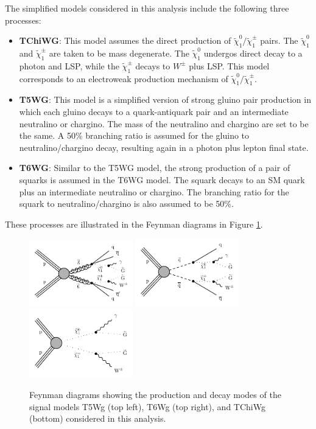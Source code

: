 \documentclass[thesis.tex]{subfiles}
\begin{document}
The simplified models considered in this analysis include the following three processes: 
	\begin{itemize}
		\item \textbf{TChiWG}: This model assumes the direct production of $\tilde{\chi}_1^0/\tilde{\chi}_1^\pm$ pairs. The $\tilde{\chi}_1^0$ and $\tilde{\chi}_1^\pm$ are taken to be mass degenerate. The $\tilde{\chi}_1^0$ undergos direct decay to a photon and LSP, while the $\tilde{\chi}_1^\pm$ decays to $W^\pm$ plus LSP. This model corresponds to an electroweak production mechanism of $\tilde{\chi}_1^0/\tilde{\chi}_1^\pm$.  
		\item  \textbf{T5WG}: This model is a simplified version of strong gluino pair production in which each gluino decays to a quark-antiquark pair and an intermediate neutralino or chargino. The mass of the neutralino and chargino are set to be the same. A 50\% branching ratio is assumed for the gluino to neutralino/chargino decay, resulting again in a photon plus lepton final state. 
		\item \textbf{T6WG}: Similar to the T5WG model, the strong production of a pair of squarks is assumed in the T6WG model. The squark decays to an SM quark plus an intermediate neutralino or chargino. The branching ratio for the squark to neutralino/chargino is also assumed to be 50\%. 
	\end{itemize}
These processes are illustrated in the Feynman diagrams in Figure \ref{fig:feyngmsb}.

	\begin{figure}[!htb]
	\centering
		\includegraphics[width=0.4\textwidth]{plot/gitT5qqqqWG.pdf}
		\includegraphics[width=0.4\textwidth]{plot/gitT6qqWG.pdf}  \\
		\includegraphics[width=0.4\textwidth]{plot/gitTChiGW.pdf} 
	\caption{Feynman diagrams showing the production and decay modes of the signal models T5Wg (top left), T6Wg (top right), and TChiWg (bottom) considered in this analysis.}
	\label{fig:feyngmsb}
	\end{figure}
\end{document}
